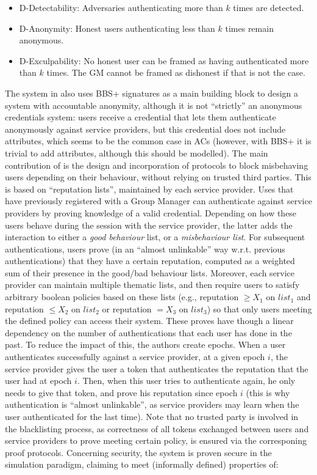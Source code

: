 \begin{itemize}
\item D-Detectability: Adversaries authenticating more than $k$ times are
  detected.  
\item D-Anonymity: Honest users authenticating less than $k$ times remain
  anonymous.
\item D-Exculpability: No honest user can be framed as having authenticated
  more than $k$ times. The GM cannot be framed as dishonest if that is not
  the case.
\end{itemize}

The system in \cite{aks12} also uses BBS+ signatures as a main building block
to design a system with accountable anonymity, although it is not ``strictly''
an anonymous credentials system: users receive a credential that lets them
authenticate anonymously against service providers, but this credential does
not include attributes, which seems to be the common case in ACs (however,
with BBS+ it is trivial to add attributes, although this should be modelled).
The main contribution of \cite{aks12} is the design and incorporation of
protocols to block misbehaving users depending on their behaviour, without
relying on trusted third parties. This is based on ``reputation lists'',
maintained by each service provider. Uses that have previously registered
with a Group Manager can authenticate against service providers by proving
knowledge of a valid credential. Depending on how these users behave during
the session with the service provider, the latter adds the interaction to
either a \emph{good behaviour} list, or a \emph{misbehaviour list}. For
subsequent authentications, users prove (in an ``almost unlinkable'' way
w.r.t. previous authentications) that they have a certain reputation,
computed as a weighted sum of their presence in the good/bad behaviour
lists. Moreover, each service provider can maintain multiple thematic lists,
and then require users to satisfy arbitrary boolean policies based on these
lists (e.g., reputation $\ge X_1$ on $list_1$ and reputation $\le X_2$ on
$list_2$ or reputation $= X_3$ on $list_3$) so that only users meeting
the defined policy can access their system. These proves have though a linear
dependency on the number of authentications that each user has done in
the past. To reduce the impact of this, the authors create epochs. When a
user authenticates successfully against a service provider, at a given epoch
$i$, the service provider gives the user a token that authenticates the
reputation that the user had at epoch $i$. Then, when this user tries to
authenticate again, he only needs to give that token, and prove his reputation
since epoch $i$ (this is why authentication is ``almost unlinkable'', as
service providers may learn when the user authenticated for the last time).
Note that no trusted party is involved in the blacklisting process, as
correctness of all tokens exchanged between users and service providers to prove
meeting certain policy, is ensured via the corresponing proof protocols.
Concerning security, the system is proven secure in the simulation paradigm,
claiming to meet (informally defined) properties of:

